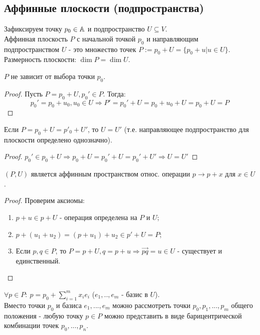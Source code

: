 \subsection{Аффинные плоскости (подпространства)}
\begin{definition}
    Зафиксируем точку $p_0 \in \mathbb{A}$ и подпространство $U \subseteq V$.\\
    Аффинная плоскость $P$ с начальной точкой $p_0$ и направляющим подпространством $U$ - это множество точек $P := p_0 + U = \{p_0 + u | u \in U\}$.\\
    Размерность плоскости: $\dim P = \dim U$.
\end{definition}
\begin{subtheorem}
    $P$ не зависит от выбора точки $p_0$.
\end{subtheorem}
\begin{proof}
    Пусть $P = p_0 + U, p_0' \in P$. Тогда:
    $$p_0' = p_0 + u_0, u_0 \in U \Longrightarrow P' = p_0' + U = p_0 + u_0 + U = p_0 + U = P$$
\end{proof}
\begin{subtheorem}
    Если $P = p_0 + U = p'_0 + U'$, то $U = U'$ (т.е. направляющее подпространство для плоскости определено однозначно).
\end{subtheorem}
\begin{proof}
    $p_0' \in p_0 + U \Longrightarrow p_0 + U = p_0' + U = p_0' + U' \Longrightarrow U = U'$
\end{proof}
\begin{subtheorem}
    $(P, U)$ является аффинным пространством относ. операции $p \rightarrow p + x$ для $x \in U$.
\end{subtheorem}
\begin{proof}
    Проверим аксиомы:
    \begin{enumerate}
        \item $p + u \in p + U$ - операция определена на $P$ и $U$;
        \item $p + (u_1 + u_2) = (p + u_1) + u_2 \in p' + U = P$;
        \item Если $p, q \in P$, то $P = p + U, q = p + u \Longrightarrow \overrightarrow{pq} = u \in U$ - существует и единственный.
    \end{enumerate}
\end{proof}

$\forall p \in P: \ p = p_0 + \sum \limits_{i=1}^m x_ie_i$ ($e_1,..,e_m$ - базис в $U$).\\
Вместо точки $p_0$ и базиса $e_1,...,e_m$ можно рассмотреть точки $p_0,p_1,...,p_m$ общего положения - любую точку $p \in P$ можно представить в виде барицентрической комбинации точек $p_0,...,p_n$. 


